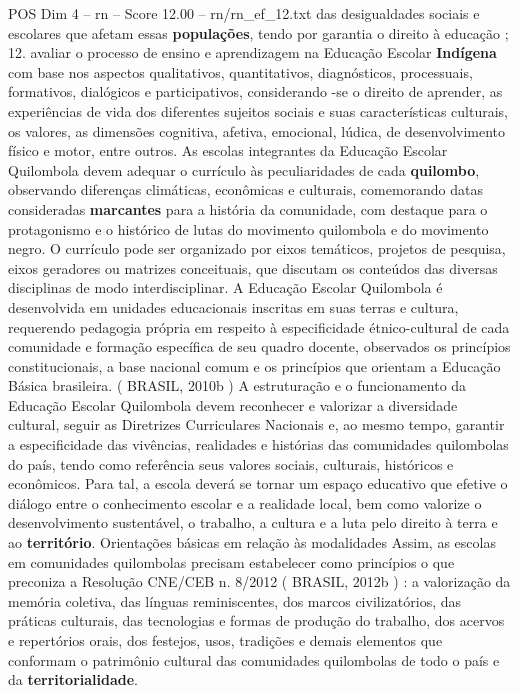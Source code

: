 \begin{textsample}{POS Dim 4 – rn – Score 12.00 – rn/rn\_ef\_12.txt}
das desigualdades sociais e escolares que afetam essas \textbf{populações}, tendo por garantia o direito à educação ; 12. avaliar o processo de ensino e aprendizagem na Educação Escolar \textbf{Indígena} com base nos aspectos qualitativos, quantitativos, diagnósticos, processuais, formativos, dialógicos e participativos, considerando -se o direito de aprender, as experiências de vida dos diferentes sujeitos sociais e suas características culturais, os valores, as dimensões cognitiva, afetiva, emocional, lúdica, de desenvolvimento físico e motor, entre outros.
As escolas integrantes da Educação Escolar Quilombola devem adequar o currículo às peculiaridades de cada \textbf{quilombo}, observando diferenças climáticas, econômicas e culturais, comemorando datas consideradas \textbf{marcantes} para a história da comunidade, com destaque para o protagonismo e o histórico de lutas do movimento quilombola e do movimento negro.
O currículo pode ser organizado por eixos temáticos, projetos de pesquisa, eixos geradores ou matrizes conceituais, que discutam os conteúdos das diversas disciplinas de modo interdisciplinar.
A Educação Escolar Quilombola é desenvolvida em unidades educacionais inscritas em suas terras e cultura, requerendo pedagogia própria em respeito à especificidade étnico-cultural de cada comunidade e formação específica de seu quadro docente, observados os princípios constitucionais, a base nacional comum e os princípios que orientam a Educação Básica brasileira. ( BRASIL, 2010b ) A estruturação e o funcionamento da Educação Escolar Quilombola devem reconhecer e valorizar a diversidade cultural, seguir as Diretrizes Curriculares Nacionais e, ao mesmo tempo, garantir a especificidade das vivências, realidades e histórias das comunidades quilombolas do país, tendo como referência seus valores sociais, culturais, históricos e econômicos.
Para tal, a escola deverá se tornar um espaço educativo que efetive o diálogo entre o conhecimento escolar e a realidade local, bem como valorize o desenvolvimento sustentável, o trabalho, a cultura e a luta pelo direito à terra e ao \textbf{território}.
Orientações básicas em relação às modalidades Assim, as escolas em comunidades quilombolas precisam estabelecer como princípios o que preconiza a Resolução CNE/CEB n. 8/2012 ( BRASIL, 2012b ) : a valorização da memória coletiva, das línguas reminiscentes, dos marcos civilizatórios, das práticas culturais, das tecnologias e formas de produção do trabalho, dos acervos e repertórios orais, dos festejos, usos, tradições e demais elementos que conformam o patrimônio cultural das comunidades quilombolas de todo o país e da \textbf{territorialidade}.

\end{textsample}
